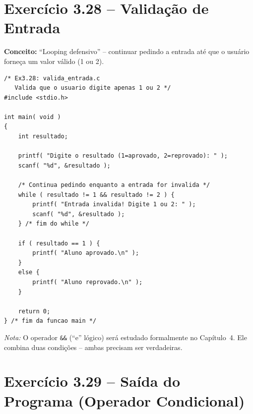 \documentclass[12pt,a4paper]{article}
\begin{document}
\section{Exercício 3.28 -- Validação de Entrada}

\begin{respostabox}
\textbf{Conceito:} ``Looping defensivo'' -- continuar pedindo a entrada até que o usuário
forneça um valor válido (1 ou 2).

\begin{lstlisting}
/* Ex3.28: valida_entrada.c
   Valida que o usuario digite apenas 1 ou 2 */
#include <stdio.h>

int main( void )
{
    int resultado;

    printf( "Digite o resultado (1=aprovado, 2=reprovado): " );
    scanf( "%d", &resultado );

    /* Continua pedindo enquanto a entrada for invalida */
    while ( resultado != 1 && resultado != 2 ) {
        printf( "Entrada invalida! Digite 1 ou 2: " );
        scanf( "%d", &resultado );
    } /* fim do while */

    if ( resultado == 1 ) {
        printf( "Aluno aprovado.\n" );
    }
    else {
        printf( "Aluno reprovado.\n" );
    }

    return 0;
} /* fim da funcao main */
\end{lstlisting}

\textit{Nota:} O operador \texttt{\&\&} (``e'' lógico) será estudado formalmente no
Capítulo~4. Ele combina duas condições -- ambas precisam ser verdadeiras.
\end{respostabox}

\newpage

\section{Exercício 3.29 -- Saída do Programa (Operador Condicional)}
\end{document}
